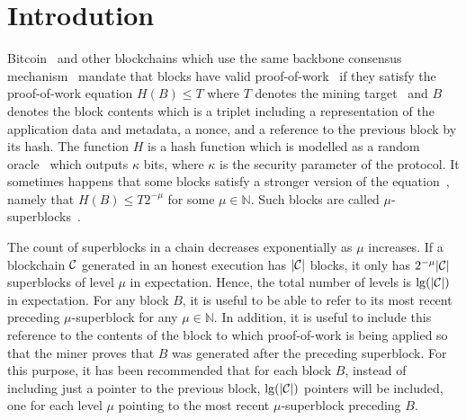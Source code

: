 \section{Introdution}

Bitcoin~\cite{bitcoin} and other blockchains which use the same backbone
consensus mechanism~\cite{EC:GarKiaLeo15} mandate that blocks have valid
proof-of-work~\cite{C:DwoNao92} if they satisfy the proof-of-work equation
$H(B) \leq T$ where $T$ denotes the mining target~\cite{SP:BMCNKF15} and $B$
denotes the block contents which is a triplet including a representation of the
application data and metadata, a nonce, and a reference to the previous block by
its hash. The function $H$ is a hash function which is modelled as a random
oracle~\cite{CCS:BelRog93} which outputs $\kappa$ bits, where $\kappa$ is the
security parameter of the protocol. It sometimes happens that some blocks
satisfy a stronger version of the equation~\cite{popow}, namely that $H(B) \leq
T2^{-\mu}$ for some $\mu \in \mathbb{N}$. Such blocks are called
$\mu$-superblocks~\cite{nipopows}.

The count of superblocks in a chain decreases exponentially as $\mu$ increases.
If a blockchain $\mathcal{C}$ generated in an honest execution has $|\mathcal{C}|$ blocks,
it only has $2^{-\mu}|\mathcal{C}|$ superblocks of level $\mu$ in expectation. Hence,
the total number of levels is $\lg(|\mathcal{C}|)$ in expectation. For any block $B$,
it is useful to be able to refer to its most recent preceding $\mu$-superblock
for any $\mu \in \mathbb{N}$. In addition, it is useful to include this
reference to the contents of the block to which proof-of-work is being applied
so that the miner proves that $B$ was generated after the preceding superblock.
For this purpose, it has been recommended that for each block $B$, instead of
including just a pointer to the previous block, $\lg(|\mathcal{C}|)$ pointers will be
included, one for each level $\mu$ pointing to the most recent $\mu$-superblock
preceding $B$.

